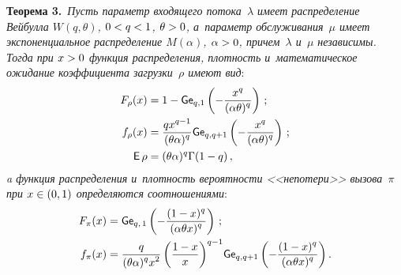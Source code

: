 \begin{multicols}{2}
\noindent
\textbf{Теорема 3.}\ 
\textit{Пусть параметр входящего потока~$\lambda$ имеет распределение 
Вейбулла $W(q,\theta)$, $0\hm<q\hm<1$, $\theta\hm>0$, а~параметр обслуживания~$\mu$ 
имеет экспоненциальное распределение $M(\alpha)$, $\alpha\hm>0$, причем~$\lambda$ 
и~$\mu$ независимы. Тогда при $x\hm>0$ функция распределения, плотность 
и~математическое ожидание коэффициента загрузки~$\rho$ имеют вид}:
\begin{align*}
F_\rho(x) &=  1 - {\sf Ge}_{q, 1}\left(-\displaystyle\frac{\displaystyle x^q\mathstrut}{\displaystyle (\alpha \theta)^q\mathstrut}\right)\,; \\
f_\rho(x) &= \displaystyle\frac{\displaystyle qx^{q-1}\mathstrut}{\displaystyle {(\theta \alpha)^q}\mathstrut} {\sf Ge}_{q, q+1}
\left( -\displaystyle\frac{\displaystyle x^q\mathstrut}{\displaystyle (\alpha \theta)^q\mathstrut}\right)\,; 
\\
{\sf E}\,\rho&=(\theta \alpha)^q \Gamma(1-q)\,,
\end{align*}
\textit{a функция распределения и~плотность вероятности <<непотери>> вызова~$\pi$ 
при $x\hm\in(0,1)$ определяются соотношениями}:
\begin{align*}
F_\pi(x) &= {\sf Ge}_{q,\, 1}\left(-\displaystyle\frac{\displaystyle (1-x)^q\mathstrut}{\displaystyle (\alpha \theta x)^q\mathstrut}\right)\,;
\\
f_\pi(x) &= \displaystyle\frac{\displaystyle q\mathstrut}{\displaystyle {(\theta \alpha)^q x^2}\mathstrut}\left(
\displaystyle\frac{\displaystyle 1-x\mathstrut}{\displaystyle {x}\mathstrut}\right)^{q-1}\! {\sf Ge}_{q, q + 1}\left(
-\displaystyle\frac{\displaystyle (1-x)^q\mathstrut}{\displaystyle (\alpha \theta x)^q\mathstrut}\right).
\end{align*}



\end{multicols}
